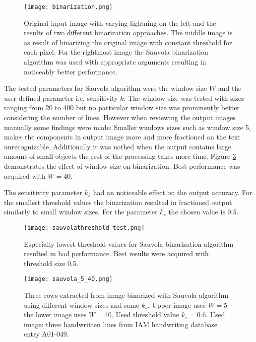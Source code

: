 \documentclass{article}
\begin{document}
    \begin{figure}[!ht]
      \centering
      \texttt{[image: binarization.png]}
      \caption{Original input image with varying lightning on the left and the results of two different binarization approaches. The middle image is as result of binarizing the original image with constant threshold for each pixel. For the rightmost image the Sauvola binarization algorithm was used with appropriate arguments resulting in noticeably better performance. \label{fig:binarization}}
    \end{figure}


    The tested parameters for Sauvola algorithm were the window size $W$ and the user defined parameter i.e. sensitivity $k$. The window size was tested with sizes ranging from 20 to 400 but no particular window size was prominently better considering the number of lines. However when reviewing the output images manually some findings were made: Smaller windows sizes such as window size 5, makes the components in output image more and more fractioned an the text unrecognizable. Additionally it was nothed when the output contains large amount of small objects the rest of the processing takes more time. Figure \ref{fig:sauvola540} demonstrates the effect of window size on binarization. Best performance was acquired with $W = 40$.

    The sensitivity parameter $k_s$ had an noticeable effect on the output accuracy. For the smallest threshold values the binarization resulted in fractioned output similarly to small window sizes. For the parameter $k_s$ the chosen value is 0.5.

    \begin{figure}[!ht]
      \centering
      \texttt{[image: sauvolathreshold\_test.png]}
      \caption{Especially lowest threshold values for Sauvola binarization algorithm resulted in bad performance. Best results were acquired with threshold size 0.5. \label{fig:sauvolathreshold}}
    \end{figure}

    \begin{figure}[!ht]
      \centering
      \texttt{[image: sauvola\_5\_40.png]}
      \caption{Three rows extracted from image binarized with Sauvola algorithm using different window sizes and same $k_s$. Upper image uses $W = 5$  the lower image uses $W = 40$. Used threshold value $k_s = 0.6$. Used image: three handwritten lines from IAM handwriting database entry A01-049. \label{fig:sauvola540}}
    \end{figure}
\end{document}
